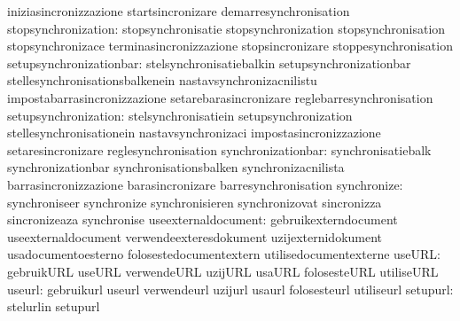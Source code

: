                                   iniziasincronizzazione           startsincronizare
                                  demarresynchronisation
             stopsynchronization: stopsynchronisatie               stopsynchronization
                                  stopsynchronisation              stopsynchronizace
                                  terminasincronizzazione          stopsincronizare
                                  stoppesynchronisation
         setupsynchronizationbar: stelsynchronisatiebalkin         setupsynchronizationbar
                                  stellesynchronisationsbalkenein  nastavsynchronizacnilistu
                                  impostabarrasincronizzazione     setarebarasincronizare
                                  reglebarresynchronisation
            setupsynchronization: stelsynchronisatiein             setupsynchronization
                                  stellesynchronisationein         nastavsynchronizaci
                                  impostasincronizzazione          setaresincronizare
                                  reglesynchronisation
              synchronizationbar: synchronisatiebalk               synchronizationbar
                                  synchronisationsbalken           synchronizacnilista
                                  barrasincronizzazione            barasincronizare
                                  barresynchronisation
                     synchronize: synchroniseer                    synchronize
                                  synchronisieren                  synchronizovat
                                  sincronizza                      sincronizeaza
                                  synchronise
             useexternaldocument: gebruikexterndocument            useexternaldocument
                                  verwendeexteresdokument          uzijexternidokument
                                  usadocumentoesterno              folosestedocumentextern
                                  utilisedocumentexterne
                          useURL: gebruikURL                       useURL
                                  verwendeURL                      uzijURL
                                  usaURL                           folosesteURL
                                  utiliseURL
                          useurl: gebruikurl                       useurl
                                  verwendeurl                      uzijurl
                                  usaurl                           folosesteurl
                                  utiliseurl
                        setupurl: stelurlin                        setupurl
